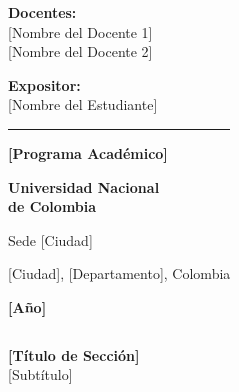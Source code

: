 \documentclass[11pt, aspectratio=169, spanish]{beamer}
\begin{document}
{\begin{frame}[plain]
\begin{columns}[T]
\begin{tcolorbox}[colback=VerdeUNAL!10,colframe=VerdeUNAL!90,boxrule=1.5pt,arc=3mm,title={\centering\footnotesize\textbf{Información Académica}}]
{\footnotesize \textbf{Docentes:}\\[0.03cm]
{\scriptsize [Nombre del Docente 1]}\\
{\scriptsize [Nombre del Docente 2]}}

\vspace{0.2cm}

{\footnotesize \textbf{Expositor:}\\[0.03cm]
{\scriptsize [Nombre del Estudiante]}}

\vspace{0.2cm}

\textcolor{VerdeUNAL}{\rule{\textwidth}{1pt}}

\vspace{0.12cm}

\centering
{\tiny \textbf{[Programa Académico]}}

\vspace{0.12cm}

{\scriptsize \textbf{Universidad Nacional\\de Colombia}}

\vspace{0.08cm}

{\tiny Sede [Ciudad]}

\vspace{0.08cm}

{\tiny [Ciudad], [Departamento], Colombia}

\vspace{0.15cm}

{\normalsize \textcolor{VerdeUNAL}{\textbf{[Año]}}}
\end{tcolorbox}

\vspace{0.15cm}

\begin{center}
\textcolor{VerdeUNAL}{\large {}  }
\end{center}

\end{columns}

\end{frame}
}


\begin{frame}[plain]
\vspace*{1cm}
\begin{center}
{\Huge\textcolor{VerdeUNAL}{\textbf{[Título de Sección]}}}\\[0.3cm]
{\large [Subtítulo]}
\end{center}
\end{frame}
\end{document}
